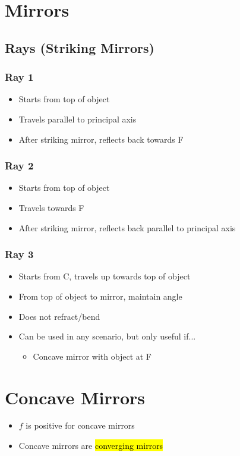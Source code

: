 \documentclass[a4paper,12pt]{article}
\begin{document}
\pagebreak

\section{Mirrors}

\subsection{Rays (Striking Mirrors)}
\subsubsection{Ray 1}
\begin{itemize}
    \item{Starts from top of object}
    \item{Travels parallel to principal axis}
    \item{After striking mirror, reflects back towards F}
\end{itemize}

\subsubsection{Ray 2}
\begin{itemize}
    \item{Starts from top of object}
    \item{Travels towards F}
    \item{After striking mirror, reflects back parallel to principal axis}
\end{itemize}

\subsubsection{Ray 3}
\begin{itemize}
    \item{Starts from C, travels up towards top of object}
    \item{From top of object to mirror, maintain angle}
    \item{Does not refract/bend}
    \item{
        Can be used in any scenario, but only useful if...
        \begin{itemize}
            \item{Concave mirror with object at F}
        \end{itemize}
    }
\end{itemize}

\section{Concave Mirrors}
\begin{itemize}
    \item{$f$ is positive for concave mirrors}
    \item{Concave mirrors are \hl{converging mirrors}}
\end{itemize}
\end{document}

